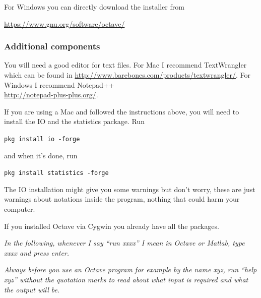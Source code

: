 \documentclass[11pt]{article}
\begin{document}
For Windows you can directly download the installer from

\url{https://www.gnu.org/software/octave/}

 
 \subsubsection{Additional components}

You will need a good editor for text files. For Mac I recommend TextWrangler which can be found in \url{http://www.barebones.com/products/textwrangler/}. For Windows I recommend Notepad++ \\ \url{http://notepad-plus-plus.org/}. 



If you are using a Mac and followed the instructions above, you will need to install the IO and the statistics package. Run

\qquad \verb+pkg install io -forge+

and when it's done, run

\qquad \verb+pkg install statistics -forge+

The IO installation might give you some warnings but don't worry, these are just warnings about notations inside the program, nothing that could harm your computer.

If you installed Octave via Cygwin you already have all the packages.

\emph{In the following, whenever I say ``run xxxx'' I mean in Octave or Matlab, type xxxx and press enter.}

\emph{Always before you use an Octave program for example by the name xyz, run ``help xyz'' without the quotation marks to read about what input is required and what the output will be.}
\end{document}
